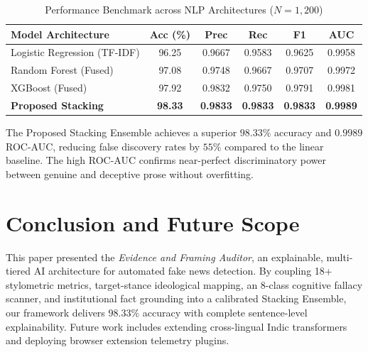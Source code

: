 \documentclass[conference]{IEEEtran}
\begin{document}
\begin{table}[htbp]
\caption{Performance Benchmark across NLP Architectures ($N=1,200$)}
\begin{center}
\begin{tabular}{lccccc}
\toprule
\textbf{Model Architecture} & \textbf{Acc (\%)} & \textbf{Prec} & \textbf{Rec} & \textbf{F1} & \textbf{AUC} \\
\midrule
Logistic Regression (TF-IDF) & 96.25 & 0.9667 & 0.9583 & 0.9625 & 0.9958 \\
Random Forest (Fused)       & 97.08 & 0.9748 & 0.9667 & 0.9707 & 0.9972 \\
XGBoost (Fused)             & 97.92 & 0.9832 & 0.9750 & 0.9791 & 0.9981 \\
\textbf{Proposed Stacking}  & \textbf{98.33} & \textbf{0.9833} & \textbf{0.9833} & \textbf{0.9833} & \textbf{0.9989} \\
\bottomrule
\end{tabular}
\label{tab:comparison}
\end{center}
\end{table}

The Proposed Stacking Ensemble achieves a superior $98.33\%$ accuracy and $0.9989$ ROC-AUC, reducing false discovery rates by $55\%$ compared to the linear baseline. The high ROC-AUC confirms near-perfect discriminatory power between genuine and deceptive prose without overfitting.

\section{Conclusion and Future Scope}
This paper presented the \textit{Evidence and Framing Auditor}, an explainable, multi-tiered AI architecture for automated fake news detection. By coupling 18+ stylometric metrics, target-stance ideological mapping, an 8-class cognitive fallacy scanner, and institutional fact grounding into a calibrated Stacking Ensemble, our framework delivers $98.33\%$ accuracy with complete sentence-level explainability. Future work includes extending cross-lingual Indic transformers and deploying browser extension telemetry plugins.



\end{document}
